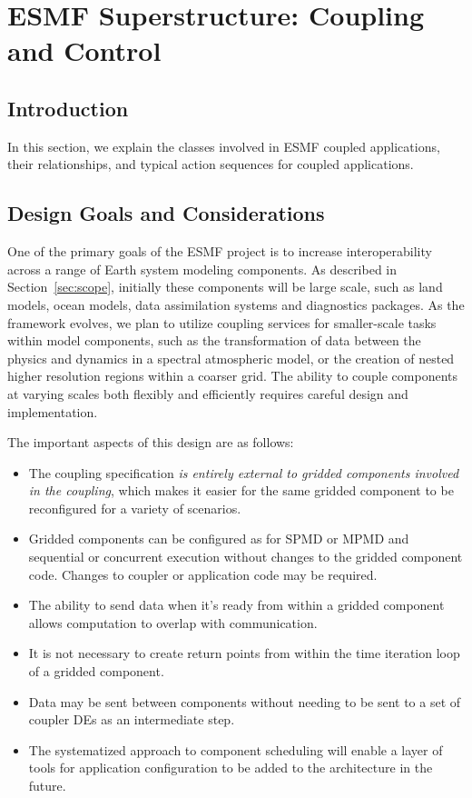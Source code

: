 \section{ESMF Superstructure:  Coupling and Control}
\label{sec:superclasses}

\subsection{Introduction}

In this section, we 
explain the classes involved in ESMF coupled applications, their 
relationships, and typical action sequences for coupled applications.  

\subsection{Design Goals and Considerations}

One of the primary goals of the ESMF project is to increase interoperability
across a range of Earth system modeling components.  As described in 
Section~\ref{sec:scope}, initially these 
components will be large scale, such as land models, ocean models, 
data assimilation systems and diagnostics packages.  As the 
framework evolves, we plan to utilize coupling services for smaller-scale 
tasks within model components, such as the transformation of data between the 
physics and dynamics in a spectral atmospheric model, or the creation 
of nested higher resolution regions within a coarser grid.  The ability to 
couple components at varying scales both flexibly and efficiently requires
careful design and implementation.  

The important aspects of this design are as follows:
\begin{itemize}
\item The coupling specification {\it is entirely external to gridded 
components involved in the coupling}, which makes it easier for the 
same gridded component to be reconfigured for a variety of scenarios.
\item Gridded components can be configured as for SPMD or MPMD and 
sequential or concurrent execution without changes to the gridded 
component code.  Changes to coupler or application code may be required. 
\item The ability to send data when it's ready from within a gridded
component allows computation to overlap with communication.  
\item It is not necessary to create return points from 
within the time iteration loop of a gridded component.  
\item Data may be sent between components without needing to 
be sent to a set of coupler DEs as an intermediate step.
\item The systematized approach to component scheduling will
enable a layer of tools for application configuration to be added to
the architecture in the future.
\end{itemize}

